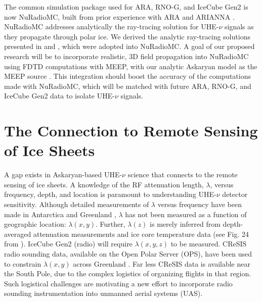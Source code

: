 \documentclass[11pt]{amsart}
\begin{document}
The common simulation package used for ARA, RNO-G, and IceCube Gen2 is now NuRadioMC, built from prior experience with ARA and ARIANNA \cite{10.1140/epjc/s10052-020-7612-8,10.1109/tns.2015.2468182,10.1016/j.astropartphys.2011.11.010,10.1016/j.astropartphys.2015.04.002,10.1103/physrevd.102.043021}.  NuRadioMC addresses analytically the ray-tracing solution for UHE-$\nu$ signals as they propagate through polar ice.  We derived the analytic ray-tracing solutions presented in \cite{10.1140/epjc/s10052-020-7612-8} and \cite{horizPaper}, which were adopted into NuRadioMC.  A goal of our proposed research will be to incorporate realistic, 3D field propagation into NuRadioMC using FDTD computations with MEEP, with our analytic Askaryan model as the MEEP source \cite{PhysRevD.105.123019,10.22323/1.395.1217}.  This integration should boost the accuracy of the computations made with NuRadioMC, which will be matched with future ARA, RNO-G, and IceCube Gen2 data to isolate UHE-$\nu$ signals.

\section{The Connection to Remote Sensing of Ice Sheets}
\label{sec:cresis}

A gap exists in Askaryan-based UHE-$\nu$ science that connects to the remote sensing of ice sheets.  A knowledge of the RF attenuation length, $\lambda$, versus frequency, depth, and location is paramount to understanding UHE-$\nu$ detector sensitivity.  Although detailed measurements of $\lambda$ versus frequency have been made in Antarctica and Greenland \cite{aguilar_2022,10.3189/2015jog14j214,10.3189/2015jog15j057,barwick_besson_gorham_saltzberg_2005}, $\lambda$ has not been measured as a function of geographic location: $\lambda(x,y)$.  Further, $\lambda(z)$ is merely inferred from depth-averaged attenuation measurements and ice core temperature data (see Fig. 24 from \cite{10.1016/j.astropartphys.2011.11.010}). IceCube Gen2 (radio) will require $\lambda(x,y,z)$ to be measured.  CReSIS radio sounding data, available on the Open Polar Server (OPS), have been used to constrain $\lambda(x,y)$ across Greenland \cite{10.1002/2015rs005849}.  Far less CReSIS data is available near the South Pole, due to the complex logistics of organizing flights in that region.  Such logistical challenges are motivating a new effort to incorporate radio sounding instrumentation into unmanned aerial systems (UAS). 
\end{document}
